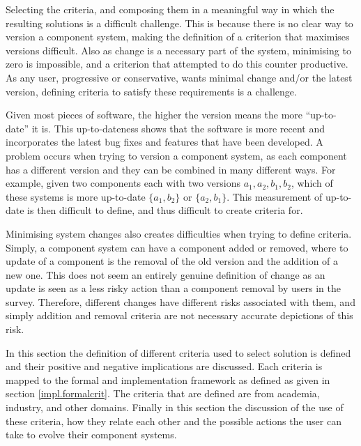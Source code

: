 Selecting the criteria, and composing them in a meaningful way in which the resulting solutions is a difficult challenge.
This is because there is no clear way to version a component system, making the definition of a criterion that maximises versions difficult.
Also as change is a necessary part of the system, minimising to zero is impossible, and a criterion that attempted to do this counter productive.
As any user, progressive or conservative, wants minimal change and/or the latest version, defining criteria to satisfy these requirements is a challenge.

Given most pieces of software, the higher the version means the more ``up-to-date'' it is.
This up-to-dateness shows that the software is more recent and incorporates the latest bug fixes and features that have been developed. 
A problem occurs when trying to version a component system, as each component has a different version and they can be combined in many different ways.
For example, given two components each with two versions $a_1,a_2,b_1,b_2$, which of these systems is more up-to-date $\{a_1,b_2\}$ or $\{a_2,b_1\}$.
This measurement of up-to-date is then difficult to define, and thus difficult to create criteria for.

Minimising system changes also creates difficulties when trying to define criteria.
Simply, a component system can have a component added or removed, where to update of a component is the removal of the old version and the addition of a new one.
This does not seem an entirely genuine definition of change as an update is seen as a less risky action than a component removal by users in the survey.  
Therefore, different changes have different risks associated with them, and simply addition and removal criteria are not necessary accurate depictions of this risk.

In this section the definition of different criteria used to select solution is defined and their positive and negative implications are discussed.
Each criteria is mapped to the formal and implementation framework as defined as given in section \ref{impl.formalcrit}. 
The criteria that are defined are from academia, industry, and other domains.
Finally in this section the discussion of the use of these criteria, how they relate each other and the possible actions the user can take to evolve their component systems.  

